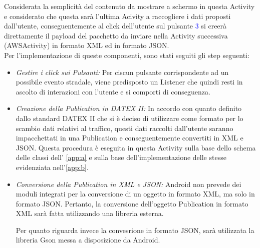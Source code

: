 Considerata la semplicità del contenuto da mostrare a schermo in questa Activity e considerato che questa sarà l'ultima Acivity a raccogliere i dati proposti dall'utente, conseguentemente al click dell'utente sul pulsante \textcolor{blue}{3} si creerà direttamente il payload del pacchetto da inviare nella Activity successiva (AWSActivity) in formato XML ed in formato JSON.\\
Per l'implementazione di queste componenti, sono stati seguiti gli step seguenti:
\begin{itemize}
	\item \textit{Gestire i click sui Pulsanti:} Per ciscun pulsante corrispondente ad un possibile evento stradale, viene predisposto un Listener che quindi resti in ascolto di interazioni con l'utente e si comporti di conseguenza.
	
	
	\item \textit{Creazione della Publication in DATEX II:} In accordo con quanto definito dallo standard DATEX II che si è deciso di utilizzare come formato per lo scambio dati relativi al traffico, questi dati raccolti dall'utente saranno impacchettati in una Publication e conseguentemente convertiti in XML e JSON. Questa procedura è eseguita in questa Activity sulla base dello schema delle classi dell' \autoref{app:a} e sulla base dell'implementazione delle stesse evidenziata nell'\autoref{app:b}.
	
	\item \textit{Conversione della Publication in XML e JSON:} Android non prevede dei moduli integrati per la conversione di un oggetto in formato XML, ma solo in formato JSON. Pertanto, la conversione dell'oggetto Publication in formato XML sarà fatta utilizzando una libreria esterna. 
	
	Per quanto riguarda invece la convesrione in formato JSON, sarà utilizzata la libreria Gson messa a disposizione da Android.
	
\end{itemize}

